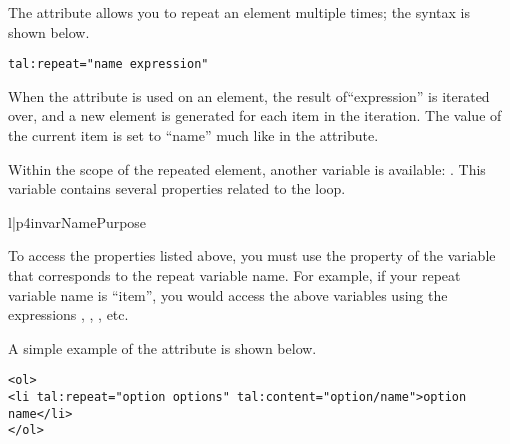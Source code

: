 The  attribute allows you to repeat an element multiple 
times; the syntax is shown below.
\begin{verbatim}
tal:repeat="name expression"
\end{verbatim}

When the  attribute is used on an element, the
result of``expression'' is iterated over, and a new element is generated
for each item in the iteration.  The value of the current item is
set to ``name'' much like in the  attribute.

Within the scope of the repeated element, another variable is available:
.  This variable contains several properties related to
the loop.  
\begin{tableii}{l|p{4in}}{var}{Name}{Purpose}
\end{tableii}

To access the properties listed above, you must use the property of 
the  variable that corresponds to the repeat variable name.
For example, if your repeat variable name is ``item'', you would access
the above variables using the expressions , 
, , etc.

A simple example of the  attribute is shown below.
\begin{verbatim}
<ol>
<li tal:repeat="option options" tal:content="option/name">option name</li>
</ol>
\end{verbatim}

